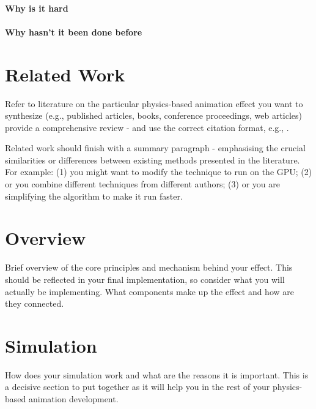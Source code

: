 \documentclass[conference]{acmsiggraph}
\begin{document}
\paragraph{Why is it hard}
\lipsum[32]

\paragraph{Why hasn't it been done before}
\lipsum[32]

\section{Related Work}

Refer to literature on the particular physics-based animation effect you want to synthesize (e.g., published articles, books, conference proceedings, web articles) provide a comprehensive review - and use the correct citation format, e.g., \cite{Sako00}.

Related work should finish with a summary paragraph - emphasising the crucial similarities or differences between existing methods presented in the literature.  For example: (1) you might want to modify the technique to run on the GPU; (2) or you combine different techniques from different authors; (3) or you are simplifying the algorithm to make it run faster.

\section{Overview}
Brief overview of the core principles and mechanism behind your effect.  This should be reflected in your final implementation, so consider what you will actually be implementing. What components make up the effect and how are they connected.


\section{Simulation}

How does your simulation work and what are the reasons it is important.  This is a decisive section to put together as it will help you in the rest of your physics-based animation development.
\end{document}
